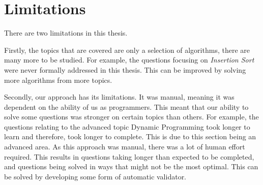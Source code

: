 \documentclass[conference]{IEEEtran}
\begin{document}

\section{Limitations}
 There are two limitations in this thesis. 
 
 Firstly, the topics that are covered are only a selection of algorithms, there are many more to be studied. For example, the questions focusing on \textit{Insertion Sort} were never formally addressed in this thesis. This can be improved by solving more algorithms from more topics.
 
 Secondly, our approach has its limitations. It was manual, meaning it was dependent on the ability of us as programmers. This meant that our ability to solve some questions was stronger on certain topics than others. For example, the questions relating to the advanced topic Dynamic Programming took longer to learn and therefore, took longer to complete. This is due to this section being an advanced area. As this approach was manual, there was a lot of human effort required. This results in questions taking longer than expected to be completed, and questions being solved in ways that might not be the most optimal. This can be solved by developing some form of automatic validator.
\end{document}
